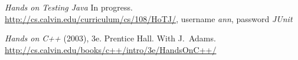 \documentclass[ComputerScience]{vita}
\newcommand{\duphref}[1]{\href{#1}{#1}}
\begin{document}
\begin{vita}
\begin{Publications}
\begin{Papers at Refereed Conferences}


  \end{Papers at Refereed Conferences}

% 
% 
% 

  \begin{Books}
  
  \item \textit{Hands on Testing Java} In progress.  \\\duphref{http://cs.calvin.edu/curriculum/cs/108/HoTJ/}, username \emph{ann}, password \emph{JUnit}

  \item \textit{Hands on C++} (2003), 3e.  Prentice Hall.  With J.\ Adams.  \\\duphref{http://cs.calvin.edu/books/c++/intro/3e/HandsOnC++/}

  \end{Books}

\end{Publications}


\end{vita}
\end{document}

